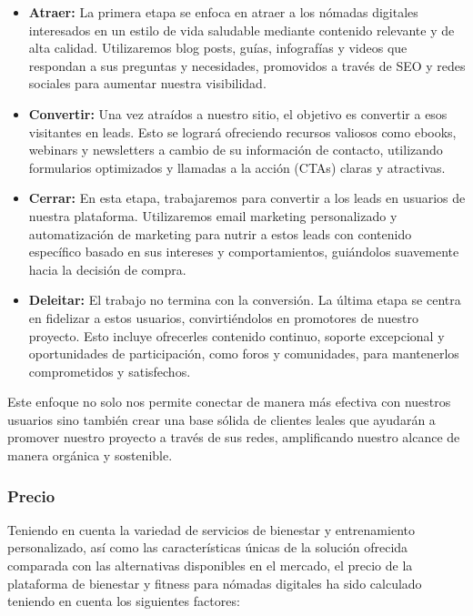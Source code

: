 {\begin{itemize}
    \item \textbf{Atraer:} La primera etapa se enfoca en atraer a los nómadas digitales interesados en un estilo de vida saludable mediante contenido relevante y de alta calidad. Utilizaremos blog posts, guías, infografías y videos que respondan a sus preguntas y necesidades, promovidos a través de SEO y redes sociales para aumentar nuestra visibilidad.
    
    \item \textbf{Convertir:} Una vez atraídos a nuestro sitio, el objetivo es convertir a esos visitantes en leads. Esto se logrará ofreciendo recursos valiosos como ebooks, webinars y newsletters a cambio de su información de contacto, utilizando formularios optimizados y llamadas a la acción (CTAs) claras y atractivas.
    
    \item \textbf{Cerrar:} En esta etapa, trabajaremos para convertir a los leads en usuarios de nuestra plataforma. Utilizaremos email marketing personalizado y automatización de marketing para nutrir a estos leads con contenido específico basado en sus intereses y comportamientos, guiándolos suavemente hacia la decisión de compra.
    
    \item \textbf{Deleitar:} El trabajo no termina con la conversión. La última etapa se centra en fidelizar a estos usuarios, convirtiéndolos en promotores de nuestro proyecto. Esto incluye ofrecerles contenido continuo, soporte excepcional y oportunidades de participación, como foros y comunidades, para mantenerlos comprometidos y satisfechos.
\end{itemize}

Este enfoque no solo nos permite conectar de manera más efectiva con nuestros usuarios sino también crear una base sólida de clientes leales que ayudarán a promover nuestro proyecto a través de sus redes, amplificando nuestro alcance de manera orgánica y sostenible.



\subsubsection*{Precio}

Teniendo en cuenta la variedad de servicios de bienestar y entrenamiento personalizado, así como las características únicas de la solución ofrecida comparada con las alternativas disponibles en el mercado, el precio de la plataforma de bienestar y fitness para nómadas digitales ha sido calculado teniendo en cuenta los siguientes factores:

}
